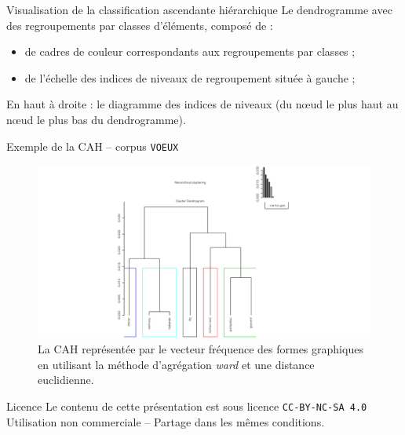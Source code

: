 \documentclass[xetex,xcolor={table,usenames,dvipsnames}]{beamer}
\begin{document}
\begin{frame}{Visualisation de la classification ascendante hiérarchique}
Le dendrogramme avec des regroupements par classes d’éléments, composé de :
	\begin{itemize}
		\item de cadres de couleur correspondants aux regroupements par classes ;
		\item de l’échelle des indices de niveaux de regroupement située à gauche ;
	\end{itemize}
En haut à droite : le diagramme des indices de niveaux (du nœud le plus haut au nœud le plus bas du dendrogramme).


\end{frame}

\begin{frame}{Exemple de la \textsc{CAH} -- corpus \texttt{VOEUX}}
			\begin{figure}[h] %
		\centering
		\includegraphics[width=1\linewidth]{img/cah.png}
		\caption{La \textsc{CAH} représentée par le vecteur fréquence des formes graphiques en utilisant la méthode d’agrégation \textit{ward} et une distance euclidienne.}
		\label{fig:ling_out_TAL}
	\end{figure}
\end{frame}
\begin{frame}[allowframebreaks]
		\printbibliography
\end{frame}

\begin{frame}{Licence}
	\centering
	{\small Le contenu de cette présentation est sous licence \texttt{CC-BY-NC-SA 4.0}\\Utilisation non commerciale -- Partage dans les mêmes conditions.\\}
	\href{https://creativecommons.org/licenses/by-nc-sa/4.0/deed.fr}{\ccbyncsa}
\end{frame}
\end{document}
